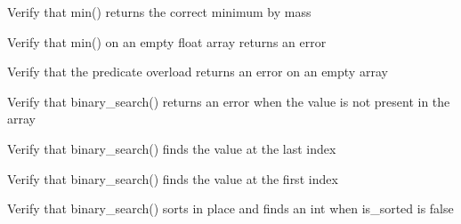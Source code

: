 \begin{DoxyRefList}
\item[Global \doxylink{test__array_8cpp_a8f1989ee44750be5b8980fe31bbae581}{TEST\+\_\+F} (\doxylink{classArrayInitTest}{Array\+Init\+Test}, Min\+Particle\+By\+Mass\+Returns\+Correct\+Value)]\label{test__test000153}%
%
Verify that min() returns the correct minimum  by mass  
\item[Global \doxylink{test__array_8cpp_a99c584d051afbcd712c86492c77dd855}{TEST\+\_\+F} (\doxylink{classArrayInitTest}{Array\+Init\+Test}, Min\+Float\+Empty\+Array\+Returns\+Error)]\label{test__test000151}%
%
Verify that min() on an empty float array returns an error  
\item[Global \doxylink{test__array_8cpp_af9f846cfd0e5c4e8c33443104a79da9d}{TEST\+\_\+F} (\doxylink{classArrayInitTest}{Array\+Init\+Test}, Contains\+Predicate\+Empty\+Array\+Returns\+Error)]\label{test__test000179}%
%
Verify that the predicate overload returns an error on an empty array  
\item[Global \doxylink{test__array_8cpp_a1ce6a7f53f7ad5877f9d02b66060c9e3}{TEST\+\_\+F} (\doxylink{classArrayInitTest}{Array\+Init\+Test}, Binary\+Search\+Int\+Not\+Found\+Returns\+Error)]\label{test__test000188}%
%
Verify that binary\+\_\+search() returns an error when the value is not present in the array  
\item[Global \doxylink{test__array_8cpp_a394d59f82fe1ec3a40af0d1ffe04983f}{TEST\+\_\+F} (\doxylink{classArrayInitTest}{Array\+Init\+Test}, Binary\+Search\+Int\+Finds\+Last\+Element)]\label{test__test000187}%
%
Verify that binary\+\_\+search() finds the value at the last index  
\item[Global \doxylink{test__array_8cpp_ae4d8d0bc298b9f06c1ff6197b4689ae8}{TEST\+\_\+F} (\doxylink{classArrayInitTest}{Array\+Init\+Test}, Binary\+Search\+Int\+Finds\+First\+Element)]\label{test__test000186}%
%
Verify that binary\+\_\+search() finds the value at the first index  
\item[Global \doxylink{test__array_8cpp_ae763c210b307c2753bed5dfcbda2aaa6}{TEST\+\_\+F} (\doxylink{classArrayInitTest}{Array\+Init\+Test}, Binary\+Search\+Int\+Sorts\+In\+Place\+Then\+Finds)]\label{test__test000185}%
%
Verify that binary\+\_\+search() sorts in place and finds an int when is\+\_\+sorted is false  
\item[Global \doxylink{test__array_8cpp_a0523ddc645f85191270451d19c718581}{TEST\+\_\+F} (\doxylink{classArrayInitTest}{Array\+Init\+Test}, Binary\+Search\+Int\+Presorted\+Ascending)]\label{test__test000184}%

\end{DoxyRefList}
